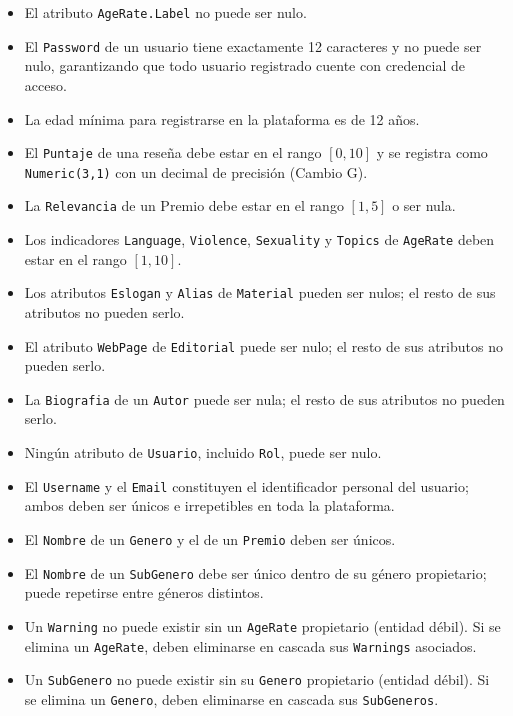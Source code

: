 \documentclass[12pt,a4paper]{article}
\begin{document}
\begin{itemize}
    \item El atributo \texttt{AgeRate.Label} no puede ser nulo.
    \item El \texttt{Password} de un usuario tiene exactamente 12 caracteres y no puede ser nulo, garantizando que todo usuario registrado cuente con credencial de acceso.
    \item La edad mínima para registrarse en la plataforma es de 12 años.
    \item El \texttt{Puntaje} de una reseña debe estar en el rango $[0, 10]$ y se registra como \texttt{Numeric(3,1)} con un decimal de precisión (Cambio G).
    \item La \texttt{Relevancia} de un Premio debe estar en el rango $[1, 5]$ o ser nula.
    \item Los indicadores \texttt{Language}, \texttt{Violence}, \texttt{Sexuality} y \texttt{Topics} de \texttt{AgeRate} deben estar en el rango $[1, 10]$.
    \item Los atributos \texttt{Eslogan} y \texttt{Alias} de \texttt{Material} pueden ser nulos; el resto de sus atributos no pueden serlo.
    \item El atributo \texttt{WebPage} de \texttt{Editorial} puede ser nulo; el resto de sus atributos no pueden serlo.
    \item La \texttt{Biografia} de un \texttt{Autor} puede ser nula; el resto de sus atributos no pueden serlo.
    \item Ningún atributo de \texttt{Usuario}, incluido \texttt{Rol}, puede ser nulo.
    \item El \texttt{Username} y el \texttt{Email} constituyen el identificador personal del usuario; ambos deben ser únicos e irrepetibles en toda la plataforma.
    \item El \texttt{Nombre} de un \texttt{Genero} y el de un \texttt{Premio} deben ser únicos.
    \item El \texttt{Nombre} de un \texttt{SubGenero} debe ser único dentro de su género propietario; puede repetirse entre géneros distintos.
    \item Un \texttt{Warning} no puede existir sin un \texttt{AgeRate} propietario (entidad débil). Si se elimina un \texttt{AgeRate}, deben eliminarse en cascada sus \texttt{Warnings} asociados.
    \item Un \texttt{SubGenero} no puede existir sin su \texttt{Genero} propietario (entidad débil). Si se elimina un \texttt{Genero}, deben eliminarse en cascada sus \texttt{SubGeneros}.

\end{itemize}
\end{document}
